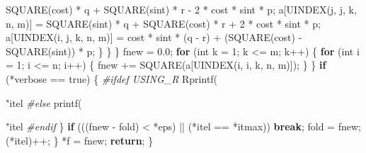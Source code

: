 \documentclass[12pt,]{article}
\newenvironment{Shaded}{\begin{snugshade}}{\end{snugshade}}
\newcommand{\ControlFlowTok}[1]{\textcolor[rgb]{0.13,0.29,0.53}{\textbf{#1}}}
\newcommand{\DataTypeTok}[1]{\textcolor[rgb]{0.13,0.29,0.53}{#1}}
\newcommand{\DecValTok}[1]{\textcolor[rgb]{0.00,0.00,0.81}{#1}}
\newcommand{\FloatTok}[1]{\textcolor[rgb]{0.00,0.00,0.81}{#1}}
\newcommand{\NormalTok}[1]{#1}
\newcommand{\PreprocessorTok}[1]{\textcolor[rgb]{0.56,0.35,0.01}{\textit{#1}}}
\newcommand{\SpecialCharTok}[1]{\textcolor[rgb]{0.00,0.00,0.00}{#1}}
\newcommand{\StringTok}[1]{\textcolor[rgb]{0.31,0.60,0.02}{#1}}
\begin{document}
\begin{Shaded}
\begin{Highlighting}[]
{{{{{{\NormalTok{              SQUARE(cost) * q + SQUARE(sint) * r - }\DecValTok{2}\NormalTok{ * cost * sint * p;}
\NormalTok{          a[UINDEX(j, j, k, n, m)] =}
\NormalTok{              SQUARE(sint) * q + SQUARE(cost) * r + }\DecValTok{2}\NormalTok{ * cost * sint * p;}
\NormalTok{          a[UINDEX(i, j, k, n, m)] =}
\NormalTok{              cost * sint * (q - r) + (SQUARE(cost) - SQUARE(sint)) * p;}
\NormalTok{        \}}
\NormalTok{      \}}
\NormalTok{    \}}
\NormalTok{    fnew = }\FloatTok{0.0}\NormalTok{;}
    \ControlFlowTok{for}\NormalTok{ (}\DataTypeTok{int}\NormalTok{ k = }\DecValTok{1}\NormalTok{; k <= m; k++) \{}
      \ControlFlowTok{for}\NormalTok{ (}\DataTypeTok{int}\NormalTok{ i = }\DecValTok{1}\NormalTok{; i <= n; i++) \{}
\NormalTok{        fnew += SQUARE(a[UINDEX(i, i, k, n, m)]);}
\NormalTok{      \}}
\NormalTok{    \}}
    \ControlFlowTok{if}\NormalTok{ (*verbose == true) \{}
\PreprocessorTok{#ifdef USING_R}
\NormalTok{      Rprintf(}\StringTok{"itel %
\PreprocessorTok{#else}
\NormalTok{      printf(}\StringTok{"itel %
\PreprocessorTok{#endif}
\NormalTok{    \}}
    \ControlFlowTok{if}\NormalTok{ (((fnew - fold) < *eps) || (*itel == *itmax))}
      \ControlFlowTok{break}\NormalTok{;}
\NormalTok{    fold = fnew;}
\NormalTok{    (*itel)++;}
\NormalTok{  \}}
\NormalTok{  *f = fnew;}
  \ControlFlowTok{return}\NormalTok{;}
\NormalTok{\}}

}}}}}}}}
\end{Highlighting}
\end{Shaded}
\end{document}
